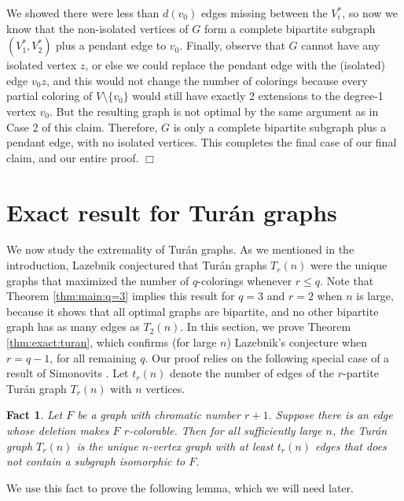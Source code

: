 \documentclass[11pt]{article}
\newtheorem{fact}{Fact}[section]
\begin{document}
We showed there were less than $d(v_0)$ edges missing between the
$V_i^*$, so now we know that the non-isolated vertices of $G$ form a
complete bipartite subgraph $(V_1^*, V_2^*)$ plus a pendant edge to
$v_0$.  Finally, observe that $G$ cannot have any isolated vertex $z$,
or else we could replace the pendant edge with the (isolated) edge
$v_0 z$, and this would not change the number of colorings because
every partial coloring of $V \setminus \{v_0\}$ would still have
exactly 2 extensions to the degree-1 vertex $v_0$.  But the resulting
graph is not optimal by the same argument as in Case 2 of this claim.
Therefore, $G$ is only a complete bipartite subgraph plus a pendant
edge, with no isolated vertices.  This completes the final case of our
final claim, and our entire proof.  \hfill $\Box$






\section{Exact result for Tur\'an graphs}
\label{sec:exact:turan}

We now study the extremality of Tur\'an graphs.  As we mentioned in
the introduction, Lazebnik conjectured that Tur\'an graphs $T_r(n)$
were the unique graphs that maximized the number of $q$-colorings
whenever $r \leq q$.  Note that Theorem \ref{thm:main:q=3} implies
this result for $q=3$ and $r=2$ when $n$ is large, because it shows
that all optimal graphs are bipartite, and no other bipartite graph
has as many edges as $T_2(n)$.  In this section, we prove Theorem
\ref{thm:exact:turan}, which confirms (for large $n$) Lazebnik's
conjecture when $r = q-1$, for all remaining $q$.  Our proof relies on
the following special case of a result of Simonovits
\cite{Simonovits}.  Let $t_r(n)$ denote the number of edges of the
$r$-partite Tur\'an graph $T_r(n)$ with $n$ vertices.

\begin{fact}
  \label{fact:simonovits}
  Let $F$ be a graph with chromatic number $r+1$.  Suppose there is an
  edge whose deletion makes $F$ $r$-colorable.  Then for all
  sufficiently large $n$, the Tur\'an graph $T_r(n)$ is the unique
  $n$-vertex graph with at least $t_r(n)$ edges that does not contain
  a subgraph isomorphic to $F$.
\end{fact}


We use this fact to prove the following lemma, which we will need
later.
\end{document}
